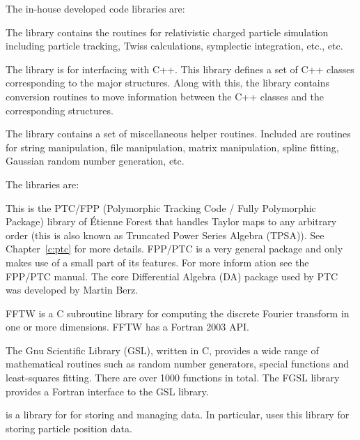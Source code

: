 {{{{{{The in-house developed code libraries are:
\begin{description}
  \item[bmad] \Newline
The  library contains the routines for relativistic charged
particle simulation including particle tracking, Twiss calculations,
symplectic integration, etc., etc.
  \item[cpp_bmad_interface]
The  library is for interfacing \bmad with C++.  This library
defines a set of C++ classes corresponding to the major \bmad structures. Along
with this, the library contains conversion routines to move information between 
the C++ classes and the corresponding \bmad structures.
  \item[sim_utils] \Newline
The  library contains a set of miscellaneous helper routines. 
Included are routines for string manipulation, file manipulation,
matrix manipulation, spline fitting, Gaussian random number generation, etc. 
\end{description}
%  
The  libraries are:
\begin{description}
  \item[forest] \Newline
This is the PTC/FPP (Polymorphic Tracking Code / Fully Polymorphic
Package) library of \'Etienne Forest that handles Taylor maps to any
arbitrary order (this is also known as Truncated Power Series Algebra
(TPSA)). See Chapter~\ref{c:ptc} for more details.  FPP/PTC is a
very general package and \bmad only makes use of a small part of its
features.  For more inform
ation see the FPP/PTC
manual\cite{b:ptc}. The core Differential Algebra (DA) package used
by PTC was developed by Martin Berz\cite{b:berz}.
%
  \item[fftw] \Newline
FFTW is a C subroutine library for computing the discrete Fourier
transform in one or more dimensions. FFTW has a Fortran 2003 API.
%
  \item[gsl / fgsl] \Newline
The Gnu Scientific Library (GSL), written in C, provides a wide range of mathematical
routines such as random number generators, special functions and least-squares
fitting. There are over 1000 functions in total. The FGSL library provides a Fortran
interface to the GSL library.
%
  \item[hdf5] \Newline
{} is a library for for storing and managing data. In particular, \bmad uses
this library for storing particle position data.

\end{description}}}}}}}
